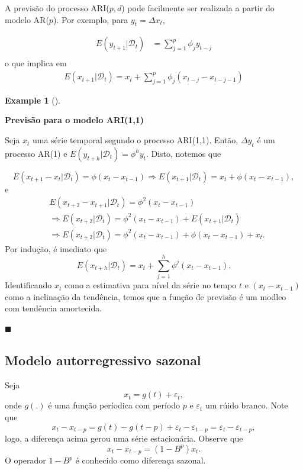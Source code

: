 \documentclass[
  letterpaper,
  DIV=11,
  numbers=noendperiod]{scrartcl}
\theoremstyle{plain}
\theoremstyle{plain}
\theoremstyle{definition}
\newtheorem{example}{Example}[chapter]
\theoremstyle{definition}
\theoremstyle{remark}
\begin{document}
A previsão do processo ARI(\(p,d\)) pode facilmente ser realizada a
partir do modelo AR(\(p\)). Por exemplo, para \(y_t=\Delta x_t\),

\[\begin{align}E(y_{t+1}|\mathcal{D}_t)&=\sum_{j=1}^p \phi_j y_{t-j}\\\end{align}\]
o que implica em
\[\begin{align} E(x_{t+1}|\mathcal{D}_t)=x_t+\sum_{j=1}^p\phi_j(x_{t-j}-x_{t-j-1})\end{align}\]

\begin{example}[]\protect\hypertarget{exm-}{}\label{exm-}

\textbf{Previsão para o modelo ARI(1,1)}

Seja \(x_t\) uma série temporal segundo o processo ARI(1,1). Então,
\(\Delta y_t\) é um processo AR(1) e
\(E(y_{t+h}|\mathcal{D}_t)=\phi^h y_t\). Disto, notemos que

\[E(x_{t+1}-x_t|\mathcal{D}_t)=\phi (x_{t}-x_{t-1})\Rightarrow E(x_{t+1}|\mathcal{D}_t)=x_t+\phi(x_t-x_{t-1}),\]
e
\[\begin{align}&E(x_{t+2}-x_{t+1}|\mathcal{D}_t)=\phi^2 (x_t-x_{t-1})\\&\Rightarrow E(x_{t+2}|\mathcal{D}_t)=\phi^2 (x_{t}-x_{t-1})+E(x_{t+1}|\mathcal{D}_t)\\ &\Rightarrow E(x_{t+2}|\mathcal{D}_t)=\phi^2 (x_{t}-x_{t-1})+\phi (x_{t}-x_{t-1})+x_t.\end{align}\]
Por indução, é imediato que
\[E(x_{t+h}|\mathcal{D}_t)=x_t+\sum_{j=1}^h \phi^{j}(x_t-x_{t-1}).\]
Identificando \(x_t\) como a estimativa para nível da série no tempo
\(t\) e \((x_t-x_{t-1})\) como a inclinação da tendência, temos que a
função de previsão é um modleo com tendência amortecida.

\(\blacksquare\)

\end{example}

\hypertarget{modelo-autorregressivo-sazonal}{%
\subsection{Modelo autorregressivo
sazonal}\label{modelo-autorregressivo-sazonal}}

Seja \[x_t = g(t)+\varepsilon_t,\] onde \(g(.)\) é uma função períodica
com período \(p\) e \(\varepsilon_t\) um rúido branco. Note que
\[x_t-x_{t-p}=g(t)-g(t-p)+\varepsilon_t-\varepsilon_{t-p}=\varepsilon_t-\varepsilon_{t-p},\]
logo, a diferença acima gerou uma série estacionária. Observe que
\[x_t-x_{t-p}=(1-B^p)x_t.\] O operador \(1-B^p\) é conhecido como
diferença sazonal.
\end{document}

